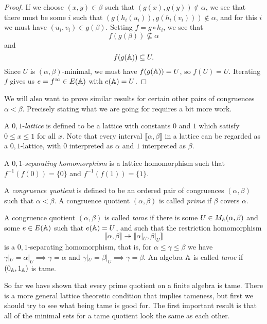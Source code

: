 \begin{appendices}
\begin{proof}
If we choose $(x,y) \in \beta$ such that $(g(x),g(y)) \not\in \alpha$, we see that there must be some $i$ such that $(g(h_i(u_i)), g(h_i(v_i))) \not\in \alpha$, and for this $i$ we must have $(u_i,v_i) \in g(\beta)$. Setting $f = g\circ h_i$, we see that
\[
f(g(\beta)) \not\subseteq \alpha
\]
and
\[
f(g(\mathbb{A})) \subseteq U.
\]
Since $U$ is $(\alpha,\beta)$-minimal, we must have $f(g(\mathbb{A})) = U$, so $f(U) = U$. Iterating $f$ gives us $e = f^{\infty} \in E(\mathbb{A})$ with $e(\mathbb{A}) = U$.
\end{proof}

We will also want to prove similar results for certain other pairs of congruences $\alpha < \beta$. Precisely stating what we are going for requires a bit more work.

\begin{defn} A $0,1$-\emph{lattice} is defined to be a lattice with constants $0$ and $1$ which satisfy $0 \le x \le 1$ for all $x$. Note that every interval $\llbracket \alpha, \beta \rrbracket$ in a lattice can be regarded as a $0,1$-lattice, with $0$ interpreted as $\alpha$ and $1$ interpreted as $\beta$.

A $0,1$-\emph{separating homomorphism} is a lattice homomorphism such that $f^{-1}(f(0)) = \{0\}$ and $f^{-1}(f(1)) = \{1\}$.
\end{defn}

\begin{defn}\label{defn-tame} A \emph{congruence quotient} is defined to be an ordered pair of congruences $(\alpha,\beta)$ such that $\alpha < \beta$. A congruence quotient $(\alpha,\beta)$ is called \emph{prime} if $\beta$ covers $\alpha$.

A congruence quotient $(\alpha,\beta)$ is called \emph{tame} if there is some $U \in M_{\mathbb{A}}(\alpha,\beta)$ and some $e \in E(\mathbb{A})$ such that $e(\mathbb{A}) = U$, and such that the restriction homomorphism
\[
\llbracket \alpha, \beta \rrbracket \twoheadrightarrow \llbracket \alpha|_U, \beta|_U \rrbracket
\]
is a $0,1$-separating homomorphism, that is, for $\alpha \le \gamma \le \beta$ we have $\gamma|_U = \alpha|_U \implies \gamma = \alpha$ and $\gamma|_U = \beta|_U \implies \gamma = \beta$. An algebra $\mathbb{A}$ is called \emph{tame} if $(0_{\mathbb{A}},1_{\mathbb{A}})$ is tame.
\end{defn}

So far we have shown that every prime quotient on a finite algebra is tame. There is a more general lattice theoretic condition that implies tameness, but first we should try to see what being tame is good for. The first important result is that all of the minimal sets for a tame quotient look the same as each other.


\end{appendices}
